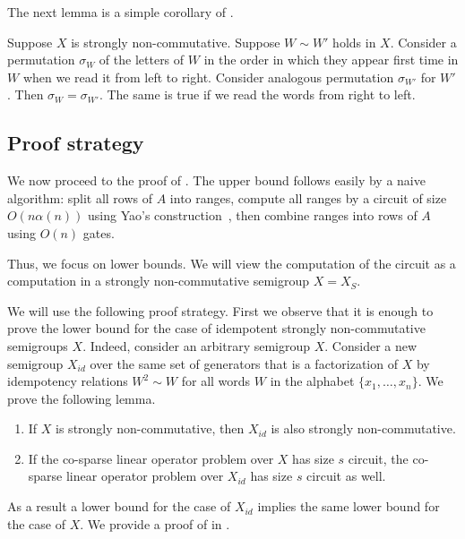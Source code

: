 The next lemma is a simple corollary of .
\begin{lemma} \label{lem:variables_order}
Suppose $X$ is strongly non-commutative. Suppose $W \sim W'$ holds in $X$. Consider a permutation $\sigma_W$ of the letters of $W$ in the order in which they appear first time in $W$ when we read it from left to right. Consider analogous permutation $\sigma_{W'}$ for $W'$. Then $\sigma_W = \sigma_{W'}$.
%
The same is true if we read the words from right to left.

\end{lemma}

\subsection{Proof strategy}


We now proceed to the proof of . The upper bound
follows easily by a naive algorithm: split all rows of $A$ into ranges, compute
all ranges by a circuit of size $O(n\alpha(n))$ using Yao's
construction~\cite{DBLP:conf/stoc/Yao82}, then combine ranges into rows of $A$
using $O(n)$ gates.

Thus, we focus on lower bounds. We will view the computation of the circuit as a
computation in a strongly non-commutative semigroup $X=X_S$.

We will use the following proof strategy. First we observe that it is enough to
prove the lower bound for the case of idempotent strongly non-commutative
semigroups $X$. Indeed,
consider an arbitrary semigroup $X$. Consider a new semigroup $X_{id}$ over the same set of generators that is a factorization of $X$ by idempotency relations $W^2\sim W$ for all words $W$ in the alphabet $\{x_1,\ldots, x_n\}$.
%
We prove the following lemma.
\begin{lemma} \label{lem:idempotent_is_hardest}
	\begin{enumerate}
\item If $X$ is strongly non-commutative, then $X_{id}$ is also strongly non-commutative.
		\item If the
        co-sparse
        linear operator problem over $X$ has size $s$
		circuit, the
        co-sparse
        linear operator problem over $X_{id}$ has size
		$s$ circuit as well.
	\end{enumerate}
\end{lemma}
As a result a lower bound for the case of $X_{id}$ implies the same lower bound for the case of $X$.
We provide a proof of  in
.

